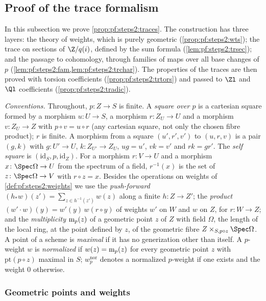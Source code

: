 \subsection{Proof of the trace formalism}\label{sec:pf:steps2:trproof}

In this subsection we prove \cref{prop:pf:steps2:traces}. The construction has three layers: the
theory of weights, which is purely geometric (\cref{prop:pf:steps2:wts}); the trace on sections of
$\Z/q(i)$, defined by the sum formula (\cref{lem:pf:steps2:trsec}); and the passage to cohomology,
through families of maps over all base changes of $p$ (\cref{lem:pf:steps2:fam,lem:pf:steps2:trchar}).
The properties of the traces are then proved with torsion coefficients
(\cref{prop:pf:steps2:trtors}) and passed to $\Zl$ and $\Ql$ coefficients
(\cref{prop:pf:steps2:tradic}).

\emph{Conventions.} Throughout, $p\colon Z\to S$ is finite. A \emph{square over $p$} is a cartesian
square formed by a morphism $u\colon U\to S$, a morphism $r\colon Z_U\to U$ and a morphism $v\colon
Z_U\to Z$ with $p\circ v=u\circ r$ (any cartesian square, not only the chosen fibre product); $r$ is
finite. A morphism from a square $(u',r',v')$ to $(u,r,v)$ is a pair $(g,k)$ with $g\colon U'\to U$,
$k\colon Z_{U'}\to Z_U$, $ug=u'$, $vk=v'$ and $rk=gr'$. The \emph{self square} is
$(\mathrm{id}_S,p,\mathrm{id}_Z)$. For a morphism $r\colon V\to U$ and a morphism $x\colon\Spec
\Omega\to U$ from the spectrum of a field, $r^{-1}(x)$ is the set of $z\colon\Spec\Omega\to V$ with
$r\circ z=x$. Besides the operations on weights of \cref{def:pf:steps2:weights} we use the
\emph{push-forward} $(h_\ast w)(z')=\sum_{z\in h^{-1}(z')}w(z)$ along a finite $h\colon Z\to Z'$; the
\emph{product} $(w'\cdot w)(y)=w'(y)\,w(r\circ y)$ of weights $w'$ on $W$ and $w$ on $Z$, for
$r\colon W\to Z$; and the \emph{multiplicity} $\mathrm{m}_p(z)$ of a geometric point $z$ of $Z$ with
field $\Omega$, the length of the local ring, at the point defined by $z$, of the geometric fibre
$Z\times_{S,p\circ z}\Spec\Omega$. A point of a scheme is \emph{maximal} if it has no generization
other than itself. A $p$-weight $w$ is \emph{normalized} if $w(z)=\mathrm{m}_p(z)$ for every geometric
point $z$ with $\mathrm{pt}(p\circ z)$ maximal in $S$; $w^{\mathrm{nor}}_p$ denotes a normalized
$p$-weight if one exists and the weight $0$ otherwise.

\subsubsection{Geometric points and weights}

